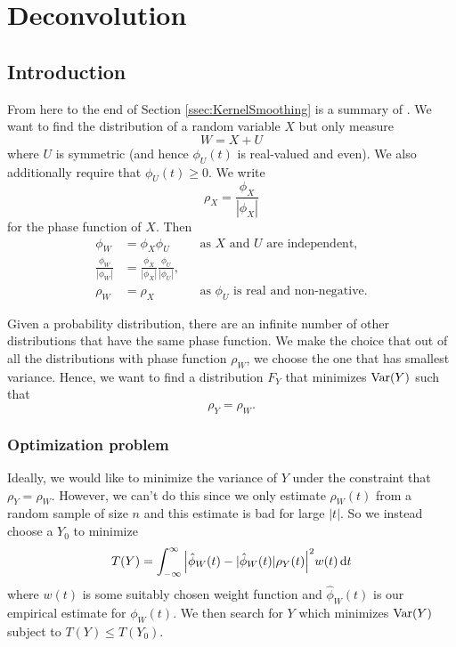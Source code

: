 \chapter{Deconvolution}
\label{Ch:Deconvolution}



\section{Introduction}
	From here to the end of Section \ref{ssec:KernelSmoothing} is a summary of \cite{Delaigle2016-la}.
	We want to find the distribution of a random variable $X$ but only measure 
	$$W = X + U$$
	where $U$ is symmetric (and hence $\phi_U(t)$ is real-valued and even). We also additionally require that $\phi_U(t) \geq 0$. We write
	$$\rho_X = \frac{\phi_X}{|\phi_X|}$$
	for the phase function of $X$. Then 
	\begin{align*}
	\phi_W &= \phi_X \phi_U	&&\text{as $X$ and $U$ are independent,}\\
	\frac{\phi_W}{|\phi_W|} &= \frac{\phi_X}{|\phi_X|}\frac{\phi_U}{|\phi_U|},\\
	\rho_W &= \rho_X	&&\text{as $\phi_U$ is real and non-negative.}
	\end{align*}

	Given a probability distribution, there are an infinite number of other distributions that have the same phase function. We make the choice that out of all the distributions with phase function $\rho_W$, we choose the one that has smallest variance. Hence, we want to find a distribution $F_Y$ that minimizes $\mathrm{Var}(Y)$ such that
	$$\rho_Y = \rho_W.$$

	\subsection{Optimization problem}
		\label{ssec:optimizationproblem}
		Ideally, we would like to minimize the variance of $Y$ under the constraint that $\rho_Y = \rho_W$. However, we can't do this since we only estimate $\rho_W(t)$ from a random sample of size $n$ and this estimate is bad for large $|t|$. So we instead choose a $Y_0$ to minimize 
		\begin{equation}
		T(Y) = \int_{-\infty}^{\infty} \Big| \hat{\phi}_W(t) - |\hat{\phi}_W(t)| \rho_Y(t) \Big|^2 w(t) \, \mathrm{d} t
		\end{equation}\label{eq:T(Y)}
		where $w(t)$ is some suitably chosen weight function and $\hat{\phi}_W(t)$ is our empirical estimate for $\phi_W(t)$. We then search for $Y$ which minimizes $\mathrm{Var}(Y)$ subject to $T(Y) \leq T(Y_0)$.

